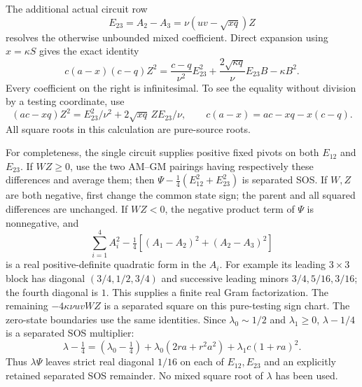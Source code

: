 The additional actual circuit row
\[
 E_{23}=A_2-A_3=\nu(uv-\sqrt{xq})Z
\]
resolves the otherwise unbounded mixed coefficient.  Direct expansion
using $x=\kappa S$ gives the exact identity
\[
 c(a-x)(c-q)Z^2
 =\frac{c-q}{\nu^2}E_{23}^2
  +\frac{2\sqrt{\kappa q}}{\nu}E_{23}B-\kappa B^2.
                                                               \tag{EL18}
\]
Every coefficient on the right is infinitesimal.  To see the equality
without division by a testing coordinate, use
\[
 (ac-xq)Z^2=E_{23}^2/\nu^2+2\sqrt{xq}\,ZE_{23}/\nu,
 \qquad c(a-x)=ac-xq-x(c-q).
\]
All square roots in this calculation are pure-source roots.

For completeness, the single circuit supplies positive fixed pivots
on both $E_{12}$ and $E_{23}$.  If $WZ\ge0$, use the two AM--GM
pairings having respectively these differences and average them;
then $\Psi-\tfrac14(E_{12}^2+E_{23}^2)$ is separated SOS.
If $W,Z$ are both negative, first change the common state sign;
the parent and all squared differences are unchanged.
If $WZ<0$, the negative product term of $\Psi$ is nonnegative,
and
\[
 \sum_{i=1}^4 A_i^2-\tfrac14[(A_1-A_2)^2+(A_2-A_3)^2]
\]
is a real positive-definite quadratic form in the $A_i$.
For example its leading $3\times3$ block has diagonal
$(3/4,1/2,3/4)$ and successive leading minors
$3/4,5/16,3/16$; the fourth diagonal is $1$.
This supplies a finite real Gram factorization.  The remaining
$-4\kappa\nu uvWZ$ is a separated square on this pure-testing sign
chart.  The zero-state boundaries use the same identities.
Since $\lambda_0\sim1/2$ and $\lambda_1\ge0$,
$\lambda-1/4$ is a separated SOS multiplier:
\[
 \lambda-\tfrac14=(\lambda_0-\tfrac14)
       +\lambda_0(2ra+r^2a^2)+\lambda_1c(1+ra)^2.
\]
Thus $\lambda\Psi$ leaves strict real diagonal $1/16$ on each of
$E_{12},E_{23}$ and an explicitly retained separated SOS remainder.
No mixed square root of $\lambda$ has been used.

